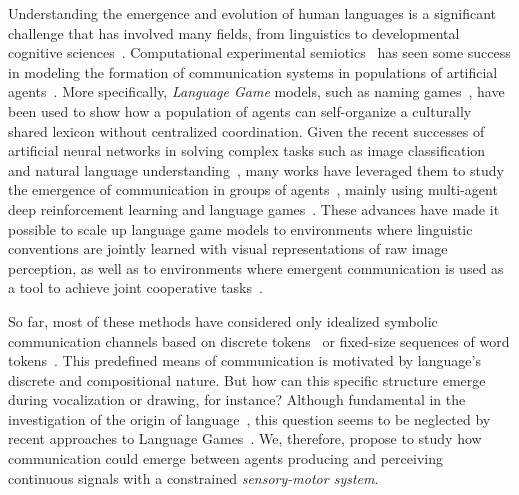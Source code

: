 Understanding the emergence and evolution of human languages is a significant challenge that has involved many fields, from linguistics to developmental cognitive sciences~\citep{CHRISTIANSEN2003300}. Computational experimental semiotics~\citep{galantucci2011experimental} has seen some success in modeling the formation of communication systems in populations of artificial agents~\citep{cangelosi2002simulating, kirby2014iterated}. More specifically, \textit{Language Game} models, such as naming games~\citep{steels2012grounded}, have been used to show how a population of agents can self-organize a culturally shared lexicon without centralized coordination. Given the recent successes of artificial neural networks in solving complex tasks such as image classification~\citep{krizhevsky2012imagenet, he2015delving, he2016deep, dosovitskiy2021image} and natural language understanding~\citep{devlin2019bert, radford2019language, brown2020language}, many works have leveraged them to study the emergence of communication in groups of agents~\citep{lazaridou2020emergent}, mainly using multi-agent deep reinforcement learning and language games~\citep{nguyen2020deep, mordatch2018emergence, lazaridou2018emergence, portelance2021emergence, chaabouni2021communicating}. These advances have made it possible to scale up language game models to environments where linguistic conventions are jointly learned with visual representations of raw image perception, as well as to environments where emergent communication is used as a tool to achieve joint cooperative tasks~\citep{barde2022learning}. 

So far, most of these methods have considered only idealized symbolic communication channels based on discrete tokens~\citep{lazaridou2017multiagent,mordatch2018emergence,chaabouni2021communicating} or fixed-size sequences of word tokens~\citep{havrylov2017emergence,portelance2021emergence}. This predefined means of communication is motivated by language's discrete and compositional nature. But how can this specific structure emerge during vocalization or drawing, for instance? Although fundamental in the investigation of the origin of language~\citep{Dessalles2000,cheney2005constraints,oller2019language}, this question seems to be neglected by recent approaches to Language Games~\citep{moulinfrier2020multi}. We, therefore, propose to study how communication could emerge between agents producing and perceiving continuous signals with a constrained \textit{sensory-motor system}. 

